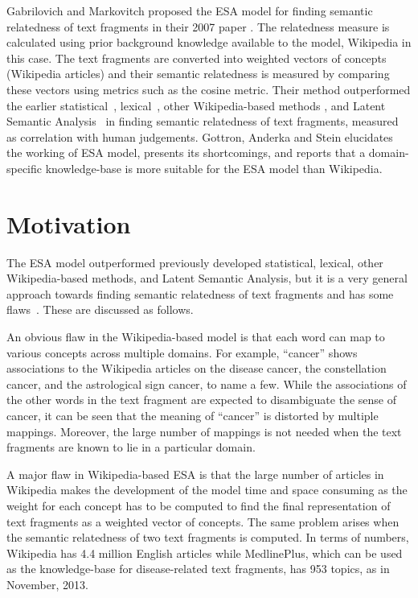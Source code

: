 \documentclass[conference]{IEEEtran}
\begin{document}
Gabrilovich and Markovitch proposed the ESA model for finding semantic relatedness of text fragments in their 2007 paper \cite{ESA}. The relatedness measure is calculated using prior background knowledge available to the model, Wikipedia in this case. The text fragments are converted into weighted vectors of concepts (Wikipedia articles) and their semantic relatedness is measured by comparing these vectors using metrics such as the cosine metric. Their method outperformed the earlier statistical~\cite{statistical}, lexical~\cite{lexical}, other Wikipedia-based methods \cite{WikiRelate}, and Latent Semantic Analysis~\cite{LSA} in finding semantic relatedness of text fragments, measured as correlation with human judgements. Gottron, Anderka and Stein \cite{insights} elucidates the working of ESA model, presents its shortcomings, and reports that a domain-specific knowledge-base is more suitable for the ESA model than Wikipedia.


\section{Motivation}

The ESA model outperformed previously developed statistical, lexical, other Wikipedia-based methods, and Latent Semantic Analysis, but it is a very general approach towards finding semantic relatedness of text fragments and has some flaws~\cite{insights}. These are discussed as follows.

An obvious flaw in the Wikipedia-based model is that each word can map to various concepts across multiple domains. For example, ``cancer'' shows associations to the Wikipedia articles on the disease cancer, the constellation cancer, and the astrological sign cancer, to name a few. While the associations of the other words in the text fragment are expected to disambiguate the sense of cancer, it can be seen that the meaning of ``cancer'' is distorted by multiple mappings. Moreover, the large number of mappings is not needed when the text fragments are known to lie in a particular domain.

A major flaw in Wikipedia-based ESA is that the large number of articles in Wikipedia makes the development of the model time and space consuming as the weight for each concept has to be computed to find the final representation of text fragments as a weighted vector of concepts. The same problem arises when the semantic relatedness of two text fragments is computed. In terms of numbers, Wikipedia has 4.4 million English articles while MedlinePlus, which can be used as the knowledge-base for disease-related text fragments, has 953 topics, as in November, 2013.
\end{document}
